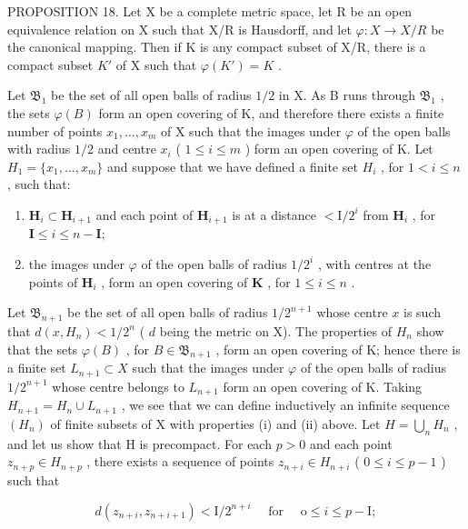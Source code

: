 PROPOSITION 18. Let X be a complete metric space, let R be an open equivalence relation on X such that X/R is Hausdorff, and let \(\varphi: X \to X/R\) be the canonical mapping. Then if K is any compact subset of X/R, there is a compact subset \(K'\) of X such that \(\varphi(K') = K\) .

Let \(\mathfrak{B}_1\) be the set of all open balls of radius \(1/2\) in X. As B runs through \(\mathfrak{B}_1\) , the sets \(\varphi(B)\) form an open covering of K, and therefore there exists a finite number of points \(x_1, \ldots, x_m\) of X such that the images under \(\varphi\) of the open balls with radius \(1/2\) and centre \(x_i\) ( \(1 \leqslant i \leqslant m\) ) form an open covering of K. Let \(H_1 = \{x_1, \ldots, x_m\}\) and suppose that we have defined a finite set \(H_i\) , for \(1 < i \leqslant n\) , such that:

\begin{enumerate}
\def\labelenumi{(\roman{enumi})}
\item
  \(\mathbf{H}_i\subset \mathbf{H}_{i + 1}\) and each point of \(\mathbf{H}_{i + 1}\) is at a distance \(<  \mathrm{I} / 2^{i}\) from \(\mathbf{H}_i\) , for \(\mathbf{I}\leqslant i\leqslant n - \mathbf{I};\)
\item
  the images under \(\varphi\) of the open balls of radius \(1/2^i\) , with centres at the points of \(\mathbf{H}_i\) , form an open covering of \(\mathbf{K}\) , for \(1 \leqslant i \leqslant n\) .
\end{enumerate}

Let \(\mathfrak{B}_{n+1}\) be the set of all open balls of radius \(1/2^{n+1}\) whose centre \(x\) is such that \(d(x, H_n) < 1/2^n\) ( \(d\) being the metric on X). The properties of \(H_n\) show that the sets \(\varphi(B)\) , for \(B \in \mathfrak{B}_{n+1}\) , form an open covering of K; hence there is a finite set \(L_{n+1} \subset X\) such that the images under \(\varphi\) of the open balls of radius \(1/2^{n+1}\) whose centre belongs to \(L_{n+1}\) form an open covering of K. Taking \(H_{n+1} = H_n \cup L_{n+1}\) , we see that we can define inductively an infinite sequence \((H_n)\) of finite subsets of X with properties (i) and (ii) above. Let \(H = \bigcup_{n} H_n\) , and let us show that H is precompact. For each \(p > 0\) and each point \(z_{n+p} \in H_{n+p}\) , there exists a sequence of points \(z_{n+i} \in H_{n+i}\) ( \(0 \leqslant i \leqslant p - 1\) ) such that

\[
d \left(z _ {n + i}, z _ {n + i + 1}\right) <   \mathrm{I} / 2 ^ {n + i} \quad \text { for } \quad \mathrm{o} \leqslant i \leqslant p - \mathrm{I};
\]

